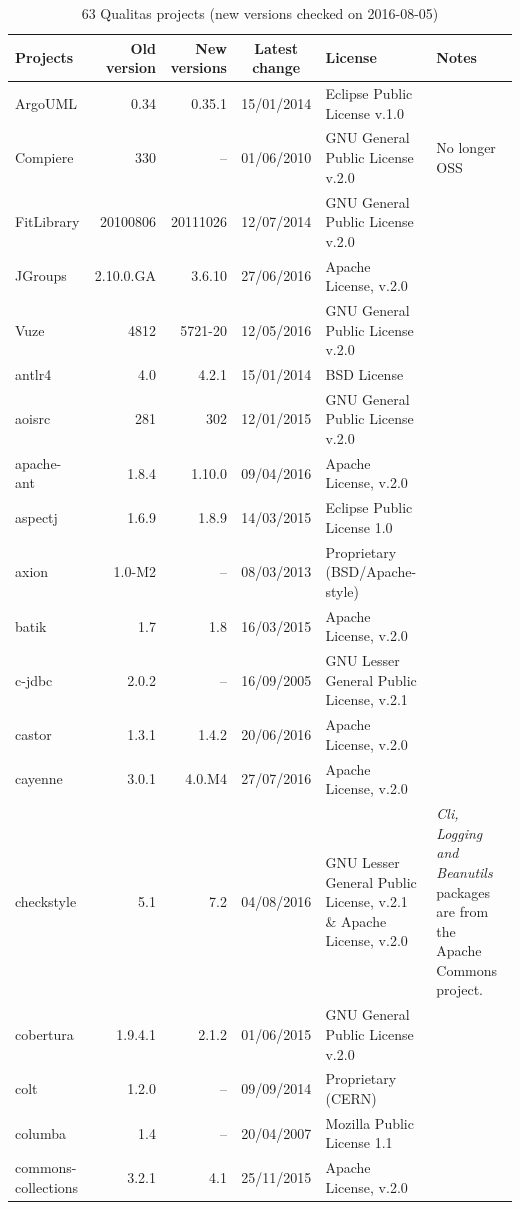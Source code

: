 \documentclass{IEEEtran}
\begin{document}
\begin{table}[h]
	\centering
	\caption{63 Qualitas projects (new versions checked on 2016-08-05)}
	\label{t:new_and_old}
\begin{tabular}{l|r|r|c|p{5cm}|p{3cm}}
	\hline 
	Projects & Old version & New versions & Latest change & License & Notes \\
	\hline
	ArgoUML & 0.34 & 0.35.1 & 15/01/2014 & Eclipse Public License v.1.0 \\
	Compiere & 330 & -- & 01/06/2010 &  GNU General Public License v.2.0 & No longer OSS \\
	FitLibrary & 20100806 & 20111026 & 12/07/2014 & GNU General Public License v.2.0 \\
	JGroups & 2.10.0.GA & 3.6.10 & 27/06/2016  & Apache License, v.2.0 \\
	Vuze & 4812 & 5721-20 & 12/05/2016 & GNU General Public License v.2.0 &  \\
	antlr4 & 4.0 & 4.2.1 & 15/01/2014 & BSD License \\
	aoisrc & 281 & 302 & 12/01/2015 &  GNU General Public License v.2.0 \\
	apache-ant & 1.8.4 & 1.10.0 & 09/04/2016 & Apache License, v.2.0 \\
	aspectj & 1.6.9 & 1.8.9 & 14/03/2015 & Eclipse Public License 1.0 \\
	axion & 1.0-M2 & -- & 08/03/2013 & Proprietary (BSD/Apache-style) \\
	batik & 1.7 & 1.8 & 16/03/2015 & Apache License, v.2.0 \\
	c-jdbc & 2.0.2 & -- & 16/09/2005 & GNU Lesser General Public License, v.2.1 \\
	castor & 1.3.1 & 1.4.2 & 20/06/2016 & Apache License, v.2.0 \\
	cayenne & 3.0.1 & 4.0.M4 &  27/07/2016 & Apache License, v.2.0 \\
	checkstyle & 5.1 & 7.2  & 04/08/2016 & GNU Lesser General Public License, v.2.1 \& Apache License, v.2.0 & \textit{Cli, Logging and Beanutils} packages are from the Apache Commons project. \\
	cobertura & 1.9.4.1 & 2.1.2 & 01/06/2015 & GNU General Public License v.2.0  \\
	colt & 1.2.0 & -- & 09/09/2014 &  Proprietary (CERN) \\
	columba & 1.4 & -- & 20/04/2007 & Mozilla Public License 1.1  \\
	commons-collections & 3.2.1 & 4.1 & 25/11/2015 & Apache License, v.2.0 \\

\end{tabular}
\end{table}
\end{document}
